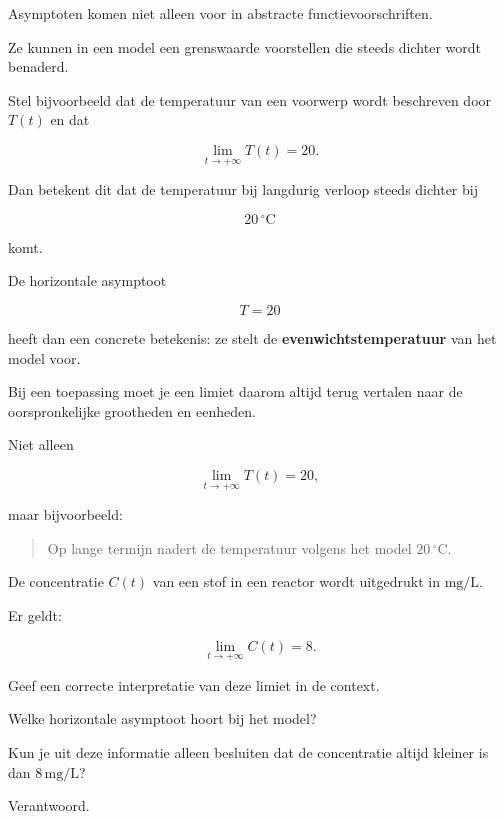 \documentclass{ximera}
\begin{document}
Asymptoten komen niet alleen voor in abstracte functievoorschriften.

Ze kunnen in een model een grenswaarde voorstellen die steeds dichter
wordt benaderd.

Stel bijvoorbeeld dat de temperatuur van een voorwerp wordt
beschreven door $T(t)$ en dat

\[
\lim_{t\to+\infty}T(t)=20.
\]

Dan betekent dit dat de temperatuur bij langdurig verloop steeds
dichter bij

\[
20\,^\circ\mathrm{C}
\]

komt.

De horizontale asymptoot

\[
T=20
\]

heeft dan een concrete betekenis: ze stelt de
\textbf{evenwichtstemperatuur} van het model voor.

\begin{opmerking}
Bij een toepassing moet je een limiet daarom altijd terug vertalen
naar de oorspronkelijke grootheden en eenheden.

Niet alleen

\[
\lim_{t\to+\infty}T(t)=20,
\]

maar bijvoorbeeld:

\begin{quote}
Op lange termijn nadert de temperatuur volgens het model
$20\,^\circ\mathrm{C}$.
\end{quote}
\end{opmerking}



\begin{oefening}{\oefU\ESS}

De concentratie $C(t)$ van een stof in een reactor wordt uitgedrukt
in $\mathrm{mg/L}$.

Er geldt:

\[
\lim_{t\to+\infty}C(t)=8.
\]

\begin{question}
Geef een correcte interpretatie van deze limiet in de context.
\end{question}

\begin{question}
Welke horizontale asymptoot hoort bij het model?
\end{question}

\begin{question}
Kun je uit deze informatie alleen besluiten dat de concentratie
altijd kleiner is dan $8\,\mathrm{mg/L}$?

Verantwoord.
\end{question}

\end{oefening}
\end{document}
